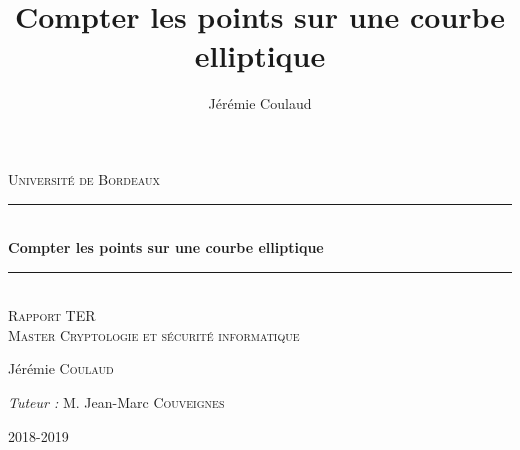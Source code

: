 \documentclass[12pt]{article}
\title{Compter les points sur une courbe elliptique}
\author{Jérémie Coulaud}
\newcommand{\HRule}{\rule{\linewidth}{0.5mm}}
\begin{document}
\newtheorem{prop}{Proposition}
\newtheorem{defi}{Définition}
\newtheorem{thm}{Théorème}
\begin{titlepage}
\begin{sffamily}
\begin{center}
\textsc{\LARGE Université de Bordeaux} \\[2.0cm]

\vspace{3cm}
    \HRule \\[0.4cm]
    { \huge \bfseries Compter les points sur une courbe elliptique\\[0.4cm] }
 \HRule \\[2cm]
 
 \textsc{\large Rapport TER} \\[1.5cm]
 \textsc{\large Master Cryptologie et sécurité informatique} \\[1.5cm]
 \vspace{4cm}
    \begin{minipage}{0.4\textwidth}
      \begin{flushleft} \large
        Jérémie \textsc{Coulaud}\\
      \end{flushleft}
    \end{minipage}
    \begin{minipage}{0.4\textwidth}
      \begin{flushright} \large
        \emph{Tuteur :} M. Jean-Marc \textsc{Couveignes}\\
      \end{flushright}
    \end{minipage}

 \vfill
    {\large 2018-2019}

\end{center}
\end{sffamily}
\end{titlepage}
\newpage
\tableofcontents
\newpage
\end{document}
